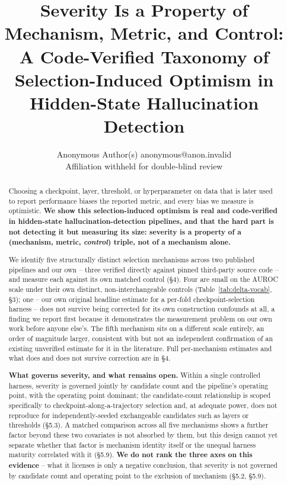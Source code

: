 \documentclass[10pt]{article} %
\title{Severity Is a Property of Mechanism, Metric, and Control: A
Code-Verified Taxonomy of Selection-Induced Optimism in Hidden-State
Hallucination Detection}
\author{\name Anonymous Author(s) \email anonymous@anon.invalid \\
      \addr Affiliation withheld for double-blind review}
\begin{document}
\maketitle


\begin{abstract}
Choosing a checkpoint, layer, threshold, or hyperparameter on data that is
later used to report performance biases the reported metric, and every bias
we measure is optimistic. \textbf{We show this selection-induced optimism is
real and code-verified in hidden-state hallucination-detection pipelines,
and that the hard part is not detecting it but measuring its size: severity
is a property of a (mechanism, metric, \emph{control}) triple, not of a
mechanism alone.}

We identify five structurally distinct selection mechanisms across two
published pipelines and our own -- three verified directly against pinned
third-party source code -- and measure each against its own matched control
(§4). Four are small on the AUROC scale under their own distinct,
non-interchangeable controls (Table~\ref{tab:delta-vocab}, §3); one --
our own original headline estimate for a per-fold checkpoint-selection
harness -- does not survive being corrected for its own construction
confounds at all, a finding we report first because it demonstrates the
measurement problem on our own work before anyone else's. The fifth
mechanism sits on a different scale entirely, an order of magnitude larger,
consistent with but not an independent confirmation of an existing
unverified estimate for it in the literature. Full per-mechanism estimates
and what does and does not survive correction are in §4.

\textbf{What governs severity, and what remains open.} Within a single
controlled harness, severity is governed jointly by candidate count and the
pipeline's operating point, with the operating point dominant; the
candidate-count relationship is scoped specifically to
checkpoint-along-a-trajectory selection and, at adequate power, does not
reproduce for independently-seeded exchangeable candidates such as layers
or thresholds (§5.3). A matched comparison across all five mechanisms shows
a further factor beyond these two covariates is not absorbed by them, but
this design cannot yet separate whether that factor is mechanism identity
itself or the unequal harness maturity correlated with it (§5.9).
\textbf{We do not rank the three axes on this evidence} -- what it licenses
is only a negative conclusion, that severity is not governed by candidate
count and operating point to the exclusion of mechanism (§5.2, §5.9).


\end{abstract}
\end{document}
